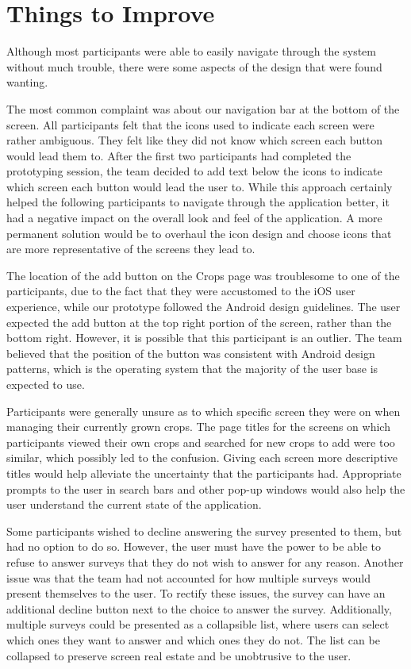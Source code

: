 \documentclass[12pt,letterpaper]{article}
\begin{document}
\section{Things to Improve}
Although most participants were able to easily navigate through the system without much trouble, there were some aspects of the design that were found wanting.\par
The most common complaint was about our navigation bar at the bottom of the screen. All participants felt that the icons used to indicate each screen were rather ambiguous. They felt like they did not know which screen each button would lead them to. After the first two participants had completed the prototyping session, the team decided to add text below the icons to indicate which screen each button would lead the user to. While this approach certainly helped the following participants to navigate through the application better, it had a negative impact on the overall look and feel of the application. A more permanent solution would be to overhaul the icon design and choose icons that are more representative of the screens they lead to.\par
The location of the add button on the Crops page was troublesome to one of the participants, due to the fact that they were accustomed to the iOS user experience, while our prototype followed the Android design guidelines. The user expected the add button at the top right portion of the screen, rather than the bottom right. However, it is possible that this participant is an outlier. The team believed that the position of the button was consistent with Android design patterns, which is the operating system that the majority of the user base is expected to use.\par
Participants were generally unsure as to which specific screen they were on when managing their currently grown crops. The page titles for the screens on which participants viewed their own crops and searched for new crops to add were too similar, which possibly led to the confusion. Giving each screen more descriptive titles would help alleviate the uncertainty that the participants had. Appropriate prompts to the user in search bars and other pop-up windows would also help the user understand the current state of the application.\par
Some participants wished to decline answering the survey presented to them, but had no option to do so. However, the user must have the power to be able to refuse to answer surveys that they do not wish to answer for any reason. Another issue was that the team had not accounted for how multiple surveys would present themselves to the user. To rectify these issues, the survey can have an additional decline button next to the choice to answer the survey. Additionally, multiple surveys could be presented as a collapsible list, where users can select which ones they want to answer and which ones they do not. The list can be collapsed to preserve screen real estate and be unobtrusive to the user.\par
\end{document}
